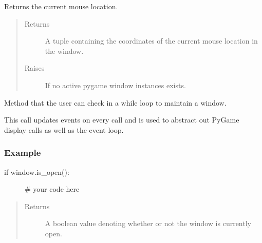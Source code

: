 \documentclass[letterpaper,10pt,english,openany,oneside]{sphinxmanual}
\begin{document}
\begin{fulllineitems}
\begin{fulllineitems}
\end{fulllineitems}



\begin{fulllineitems}

\pysigstartsignatures
{}
\pysigstopsignatures
\sphinxAtStartPar
Returns the current mouse location.
\begin{quote}\begin{description}
\item[{Returns}] \leavevmode
\sphinxAtStartPar
A tuple containing the coordinates of the current mouse location in the window.

\item[{Raises}] \leavevmode
\sphinxAtStartPar
{} \textendash{} If no active pygame window instances exists.

\end{description}\end{quote}

\end{fulllineitems}



\begin{fulllineitems}

\pysigstartsignatures
{}
\pysigstopsignatures
\sphinxAtStartPar
Method that the user can check in a while loop to maintain a window.

\sphinxAtStartPar
This call updates events on every call and is used to abstract out PyGame
display calls as well as the event loop.
\subsubsection*{Example}
\begin{description}
\item[{if window.is\_open():}] \leavevmode
\sphinxAtStartPar
\# your code here

\end{description}
\begin{quote}\begin{description}
\item[{Returns}] \leavevmode
\sphinxAtStartPar
A boolean value denoting whether or not the window is currently open.


\end{description}
\end{quote}
\end{fulllineitems}
\end{fulllineitems}
\end{document}
